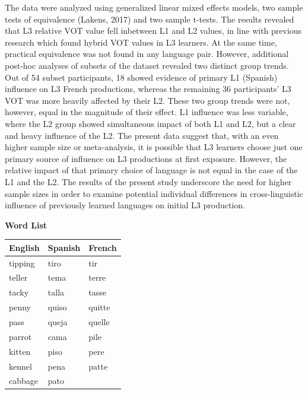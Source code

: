 \documentclass[
  12pt,
]{article}
\begin{document}
The data were analyzed using generalized linear mixed effects models,
two sample tests of equivalence (Lakens, 2017) and two sample t-tests.
The results revealed that L3 relative VOT value fell inbetween L1 and L2
values, in line with previous research which found hybrid VOT values in
L3 learners. At the same time, practical equivalence was not found in
any language pair. However, additional post-hoc analyses of subsets of
the dataset revealed two distinct group trends. Out of 54 subset
participants, 18 showed evidence of primary L1 (Spanish) influence on L3
French productions, whereas the remaining 36 participants' L3 VOT was
more heavily affected by their L2. These two group trends were not,
however, equal in the magnitude of their effect. L1 influence was less
variable, where the L2 group showed simultaneous impact of both L1 and
L2, but a clear and heavy influence of the L2. The present data suggest
that, with an even higher sample size or meta-analysis, it is possible
that L3 learners choose just one primary source of influence on L3
productions at first exposure. However, the relative impact of that
primary choice of language is not equal in the case of the L1 and the
L2. The results of the present study underscore the need for higher
sample sizes in order to examine potential individual differences in
cross-linguistic influence of previously learned languages on initial L3
production.

\newpage

\textbf{Word List}

\begin{longtable}[]{@{}lll@{}}
\toprule
English & Spanish & French \\
\midrule
\endhead
tipping & tiro & tir \\
teller & tema & terre \\
tacky & talla & tasse \\
penny & quiso & quitte \\
pass & queja & quelle \\
parrot & cama & pile \\
kitten & piso & pere \\
kennel & pena & patte \\
cabbage & pato & \\
\bottomrule
\end{longtable}
\end{document}
